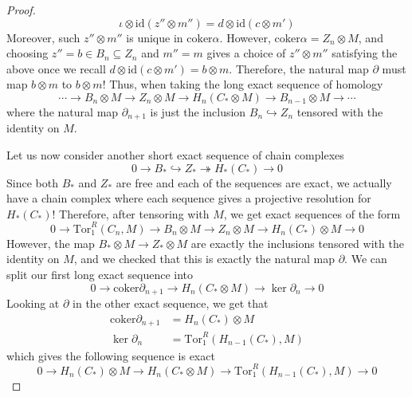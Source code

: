 \documentclass[12pt,reqno]{amsart}
\numberwithin{theorem}{section}
\theoremstyle{definition}
\theoremstyle{remark}
\numberwithin{equation}{section}
\newcommand{\del}{\partial}
\theoremstyle{definition}
\newcommand{\id}{\mathrm{id}}
\newcommand{\coker}{\mathrm{coker}}
\newcommand{\Tor}{\mathrm{Tor}}
\newcommand{\mono}{\hookrightarrow}
\newcommand{\epi}{\twoheadrightarrow}
\begin{document}
\begin{proof}
    $$\iota \otimes \id (z'' \otimes m'')  =d\otimes \id(c\otimes m')$$
    Moreover, such $z'' \otimes m''$ is unique in $\coker \alpha$. However, $\coker \alpha = Z_n\otimes M$, and choosing $z'' = b \in B_n \subseteq Z_n$ and $m'' = m$ gives a choice of $z'' \otimes m''$ satisfying the above once we recall $d\otimes \id(c\otimes m') = b\otimes m$. Therefore, the natural map $\del$ must map $b \otimes m$ to $b\otimes m$! Thus, when taking the long exact sequence of homology
    $$\cdots \rightarrow B_n \otimes M\rightarrow Z_n \otimes M \rightarrow H_n(C_*\otimes M) \rightarrow B_{n-1}\otimes M \rightarrow \cdots$$
    where the natural map $\del_{n+1}$ is just the inclusion $B_n \mono Z_n$ tensored with the identity on $M$. 
    
    Let us now consider another short exact sequence of chain complexes
    $$0 \rightarrow B_* \mono Z_* \epi H_*(C_*) \rightarrow 0$$
    Since both $B_*$ and $Z_*$ are free and each of the sequences are exact, we actually have a chain complex where each sequence gives a projective resolution for $H_*(C_*)$! Therefore, after tensoring with $M$, we get exact sequences of the form
    $$0 \rightarrow \Tor_1^R(C_n,M)\rightarrow B_n \otimes M \rightarrow  Z_n \otimes M \rightarrow  H_n(C_*) \otimes M \rightarrow 0$$
    However, the map $B_*\otimes M \rightarrow Z_* \otimes M$ are exactly the inclusions tensored with the identity on $M$, and we checked that this is exactly the natural map $\del$. We can split our first long exact sequence into
    $$0 \rightarrow \coker \del_{n+1} \rightarrow H_n(C_*\otimes M)\rightarrow \ker  \del_{n} \rightarrow 0$$
    Looking at $\del$ in the other exact sequence, we get that
    \begin{align*}
        \coker \del_{n+1} &=  H_n(C_*)\otimes M \\
        \ker \del_n &=  \Tor_1^R(H_{n-1}(C_*),M)
    \end{align*}
    which gives the following sequence is exact
    $$0 \rightarrow H_n(C_*)\otimes M \rightarrow H_n(C_*\otimes M)\rightarrow  \Tor_1^R(H_{n-1}(C_*),M) \rightarrow 0$$


\end{proof}
\end{document}
